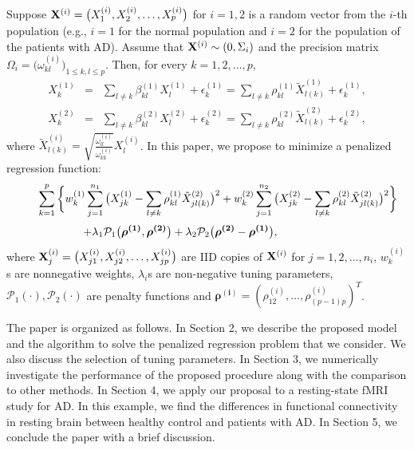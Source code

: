 \documentclass[useAMS,usenatbib,referee]{bio}
\newcommand{\bs}{\boldsymbol}
\begin{document}
{{Suppose ${\bf X}^{(i)} =\big(X^{(i)}_{1},X^{(i)}_{2},\ldots,X^{(i)}_{p}\big)$ for $i=1,2$ is 
a random vector from the $i$-th population (e.g., $i=1$ for the normal population and $i=2$ for the population of the patients with AD). 
Assume that ${\bf X}^{(i)} \sim (0,\Sigma_i)$ and the precision matrix $\Omega_i=\big(\omega_{kl}^{(i)} \big)_{1\le k,l\le p}$. 
Then, for every
$k=1,2,\ldots,p$,
\begin{eqnarray} 
X^{(1)}_{k} &=& \sum_{l \neq k} \beta^{(1)}_{kl} X^{(1)}_{l} + \epsilon^{(1)}_{k} = \sum_{l \neq k} \rho^{(1)}_{kl} \tilde{X}^{(1)}_{l(k)} + \epsilon^{(1)}_{k}, \label{eqn:iden} \nonumber\\
X^{(2)}_{k} &=& \sum_{l \neq k} \beta^{(2)}_{kl} X^{(2)}_{l} + \epsilon^{(2)}_{k} =\sum_{l \neq k} \rho^{(2)}_{kl} \tilde{X}^{(2)}_{l(k)} + \epsilon^{(2)}_{k}, \nonumber
\end{eqnarray}
where $\tilde{X}^{(i)}_{l(k)}= \sqrt{\frac{\omega^{(i)}_{ll}}{\omega^{(i)}_{kk}} } X^{(i)}_{l}$. 
In this paper, we propose to minimize a penalized regression function:
\begin{equation} \label{eqn:main}
\begin{array}{lll}  \medskip
&& \displaystyle
 \sum_{k=1}^p \bigg\{w^{(1)}_{k} \sum_{j=1}^{n_1} \big(X_{jk}^{(1)} -  \sum_{l \neq k} \rho^{(1)}_{kl} \tilde{X}_{jl(k)}^{(2)} \big)^2 + w^{(2)}_{k}
\sum_{j=1}^{n_2} \big( X_{jk}^{(2)} - \sum_{l \neq k} \rho^{(2)}_{kl} \tilde{X}_{jl(k)}^{(2)}  \big)^2 \bigg\}  \\
&& \displaystyle \qquad \qquad
+ \lambda_1 \mathcal{P}_1\big( \bs{\rho^{(1)}},\bs{\rho^{(2)}} \big) + \lambda_2 \mathcal{P}_2 \big( \bs{\rho^{(2)}} - \bs{\rho^{(1)}} \big),
\end{array}
\end{equation}
where ${\bf X}^{(i)}_j=\big(X_{j1}^{(i)}, X_{j2}^{(i)},\ldots,X_{jp}^{(i)}\big)$ are IID copies
of ${\bf X}^{(i)}$ for $j=1,2,\ldots,n_i$, $w^{(i)}_{k}$s are nonnegative weights, $\lambda_i$s are non-negative tuning parameters, $ \mathcal{P}_1(\cdot) ,
\mathcal{P}_2(\cdot) $ are penalty functions and $\bs{\rho^{(i)}}=(\rho^{(i)}_{12},\ldots,\rho^{(i)}_{(p-1)p})^T$. 


The paper is organized as follows. In Section 2, we describe the proposed model and the algorithm to solve the penalized regression problem that we consider. We also discuss the selection of tuning parameters. In Section 3, we numerically investigate the performance of the proposed procedure along with the comparison to other methods. In Section 4, we apply our proposal to a resting-state fMRI study for AD. In this example, we find the differences in functional connectivity in resting brain between healthy control and patients with AD. In Section 5, we conclude the paper with a brief discussion.


}}
\end{document}
